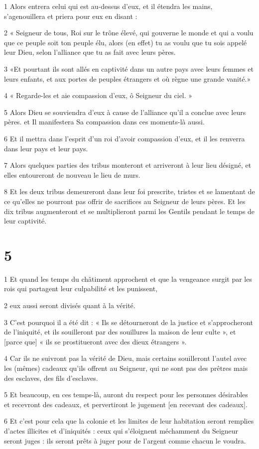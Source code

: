 \par 1 Alors entrera celui qui est au-dessus d'eux, et il étendra les mains, s'agenouillera et priera pour eux en disant :
\par 2 « Seigneur de tous, Roi sur le trône élevé, qui gouverne le monde et qui a voulu que ce peuple soit ton peuple élu, alors (en effet) tu as voulu que tu sois appelé leur Dieu, selon l'alliance que tu as fait avec leurs pères.
\par 3 «Et pourtant ils sont allés en captivité dans un autre pays avec leurs femmes et leurs enfants, et aux portes de peuples étrangers et où règne une grande vanité.»
\par 4 « Regarde-les et aie compassion d'eux, ô Seigneur du ciel. »
\par 5 Alors Dieu se souviendra d'eux à cause de l'alliance qu'il a conclue avec leurs pères. et Il manifestera Sa compassion dans ces moments-là aussi.
\par 6 Et il mettra dans l'esprit d'un roi d'avoir compassion d'eux, et il les renverra dans leur pays et leur pays.
\par 7 Alors quelques parties des tribus monteront et arriveront à leur lieu désigné, et elles entoureront de nouveau le lieu de murs.
\par 8 Et les deux tribus demeureront dans leur foi prescrite, tristes et se lamentant de ce qu'elles ne pourront pas offrir de sacrifices au Seigneur de leurs pères. Et les dix tribus augmenteront et se multiplieront parmi les Gentils pendant le temps de leur captivité.

\chapter{5}

\par 1 Et quand les temps du châtiment approchent et que la vengeance surgit par les rois qui partagent leur culpabilité et les punissent,
\par 2 eux aussi seront divisés quant à la vérité.
\par 3 C'est pourquoi il a été dit : « Ils se détourneront de la justice et s'approcheront de l'iniquité, et ils souilleront par des souillures la maison de leur culte », et [parce que] « ils se prostitueront avec des dieux étrangers ».
\par 4 Car ils ne suivront pas la vérité de Dieu, mais certains souilleront l'autel avec les (mêmes) cadeaux qu'ils offrent au Seigneur, qui ne sont pas des prêtres mais des esclaves, des fils d'esclaves.
\par 5 Et beaucoup, en ces temps-là, auront du respect pour les personnes désirables et recevront des cadeaux, et pervertiront le jugement [en recevant des cadeaux].
\par 6 Et c'est pour cela que la colonie et les limites de leur habitation seront remplies d'actes illicites et d'iniquités : ceux qui s'éloignent méchamment du Seigneur seront juges : ils seront prêts à juger pour de l'argent comme chacun le voudra.

